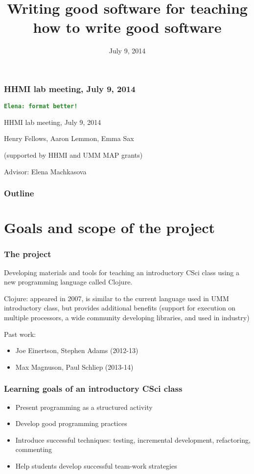 \documentclass{beamer}
\newcommand{\comment}[1]{{\bf \tt  {#1}}}
\newcommand{\emcomment}[1]{\textcolor{ForestGreen}{\comment{Elena: {#1}}}}
\begin{document}
\title{Writing good software for teaching how to write good software}
\date{July 9, 2014}

\begin{frame}
\frametitle{HHMI lab meeting, July 9, 2014}
\emcomment{format better!}

{\centering
HHMI lab meeting, July 9, 2014 \par
}
Henry Fellows, Aaron Lemmon, Emma Sax\par
(supported by HHMI and UMM MAP grants)\par
Advisor: Elena Machkasova \par
\end{frame}

\begin{frame}[fragile]
\frametitle{Outline}
	\tableofcontents
\end{frame}


\section{Goals and scope of the project}

\begin{frame}[fragile]
\frametitle{The project}
Developing materials and tools for teaching an introductory CSci class using a new programming language called Clojure.

Clojure: appeared in 2007, is similar to the current language used in UMM introductory class, but provides additional benefits 
(support for execution on multiple processors, a wide community developing libraries, and used in industry)

Past work: 
\begin{itemize}
\item Joe Einertson, Stephen Adams (2012-13)
\item  Max Magnuson, Paul Schliep (2013-14)
\end{itemize}  
\end{frame}

\begin{frame}[fragile]
\frametitle{Learning goals of an introductory CSci class}
\begin{itemize}
\item Present programming as a structured activity
\item Develop good programming practices
\item Introduce successful techniques: testing, incremental development, refactoring, commenting 
\item Help students develop successful team-work strategies
\end{itemize}
\end{frame}
\end{document}

